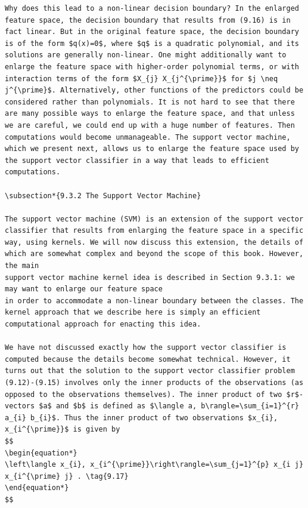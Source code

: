 \documentclass[10pt]{article}
\begin{document}
\begin{verbatim}
Why does this lead to a non-linear decision boundary? In the enlarged feature space, the decision boundary that results from (9.16) is in fact linear. But in the original feature space, the decision boundary is of the form $q(x)=0$, where $q$ is a quadratic polynomial, and its solutions are generally non-linear. One might additionally want to enlarge the feature space with higher-order polynomial terms, or with interaction terms of the form $X_{j} X_{j^{\prime}}$ for $j \neq j^{\prime}$. Alternatively, other functions of the predictors could be considered rather than polynomials. It is not hard to see that there are many possible ways to enlarge the feature space, and that unless we are careful, we could end up with a huge number of features. Then computations would become unmanageable. The support vector machine, which we present next, allows us to enlarge the feature space used by the support vector classifier in a way that leads to efficient computations.

\subsection*{9.3.2 The Support Vector Machine}

The support vector machine (SVM) is an extension of the support vector classifier that results from enlarging the feature space in a specific way, using kernels. We will now discuss this extension, the details of which are somewhat complex and beyond the scope of this book. However, the main
support vector machine kernel idea is described in Section 9.3.1: we may want to enlarge our feature space
in order to accommodate a non-linear boundary between the classes. The kernel approach that we describe here is simply an efficient computational approach for enacting this idea.

We have not discussed exactly how the support vector classifier is computed because the details become somewhat technical. However, it turns out that the solution to the support vector classifier problem (9.12)-(9.15) involves only the inner products of the observations (as opposed to the observations themselves). The inner product of two $r$-vectors $a$ and $b$ is defined as $\langle a, b\rangle=\sum_{i=1}^{r} a_{i} b_{i}$. Thus the inner product of two observations $x_{i}, x_{i^{\prime}}$ is given by
$$
\begin{equation*}
\left\langle x_{i}, x_{i^{\prime}}\right\rangle=\sum_{j=1}^{p} x_{i j} x_{i^{\prime} j} . \tag{9.17}
\end{equation*}
$$


\end{verbatim}
\end{document}
